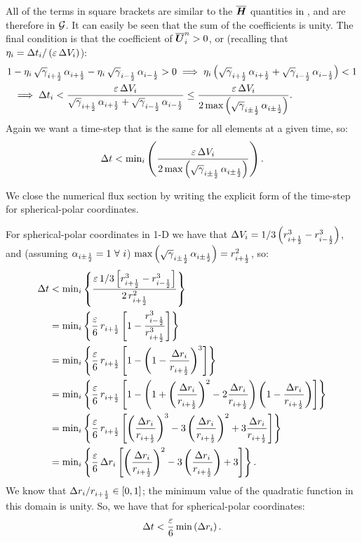 \documentclass[10pt,preprint]{aastex}
\begin{document}
All of the terms in square brackets are similar to the $\overline{\boldsymbol{H}}$ quantities in \citet{Qin2016}, and are therefore in $\mathcal{G}$. It can easily be seen that the sum of the coefficients is unity. The final condition is that the coefficient of $\overline{\boldsymbol{U}}^{n}_{i}>0$, or (recalling that $\eta_{i}=\Delta t_{i}/\left(\varepsilon\,\Delta V_{i}\right)$):
\begin{align}
    1&-\eta_{i}\,\sqrt{\gamma}_{i+\frac{1}{2}}\,\alpha_{i+\frac{1}{2}}-\eta_{i}\,\sqrt{\gamma}_{i-\frac{1}{2}}\,\alpha_{i-\frac{1}{2}}>0\implies\eta_{i}\left(\sqrt{\gamma}_{i+\frac{1}{2}}\,\alpha_{i+\frac{1}{2}}+\sqrt{\gamma}_{i-\frac{1}{2}}\,\alpha_{i-\frac{1}{2}}\right)<1\\
    &\implies\Delta t_{i}<\frac{\varepsilon\,\Delta V_{i}}{\sqrt{\gamma}_{i+\frac{1}{2}}\,\alpha_{i+\frac{1}{2}}+\sqrt{\gamma}_{i-\frac{1}{2}}\,\alpha_{i-\frac{1}{2}}}\leq\frac{\varepsilon\,\Delta V_{i}}{2\,\text{max}\left(\sqrt{\gamma}_{i\pm\frac{1}{2}}\,\alpha_{i\pm\frac{1}{2}}\right)}.
\end{align}
Again we want a time-step that is the same for all elements at a given time, so:
\begin{equation}
    \Delta t<\text{min}_{i}\left(\frac{\varepsilon\,\Delta V_{i}}{2\,\text{max}\left(\sqrt{\gamma}_{i\pm\frac{1}{2}}\,\alpha_{i\pm\frac{1}{2}}\right)}\right).
\end{equation}

We close the numerical flux section by writing the explicit form of the time-step for spherical-polar coordinates.

For spherical-polar coordinates in 1-D we have that $\Delta V_{i}=1/3\left(r_{i+\frac{1}{2}}^{3}-r_{i-\frac{1}{2}}^{3}\right)$, and (assuming $\alpha_{i\pm\frac{1}{2}}=1\ \forall\ i$) $\text{max}\left(\sqrt{\gamma}_{i\pm\frac{1}{2}}\,\alpha_{i\pm\frac{1}{2}}\right)=r_{i+\frac{1}{2}}^{2}$, so:
\begin{align}
    \Delta t&<\text{min}_{i}\left\{\frac{\varepsilon\,1/3\left[r_{i+\frac{1}{2}}^{3}-r_{i-\frac{1}{2}}^{3}\right]}{2\,r_{i+\frac{1}{2}}^{2}}\right\}\\
    &=\text{min}_{i}\left\{\frac{\varepsilon}{6}\,r_{i+\frac{1}{2}}\left[1-\frac{r_{i-\frac{1}{2}}^{3}}{r_{i+\frac{1}{2}}^{3}}\right]\right\}\\
    &=\text{min}_{i}\left\{\frac{\varepsilon}{6}\,r_{i+\frac{1}{2}}\left[1-\left(1-\frac{\Delta r_{i}}{r_{i+\frac{1}{2}}}\right)^{3}\right]\right\}\\
    &=\text{min}_{i}\left\{\frac{\varepsilon}{6}\,r_{i+\frac{1}{2}}\left[1-\left(1+\left(\frac{\Delta r_{i}}{r_{i+\frac{1}{2}}}\right)^{2}-2\frac{\Delta r_{i}}{r_{i+\frac{1}{2}}}\right)\left(1-\frac{\Delta r_{i}}{r_{i+\frac{1}{2}}}\right)\right]\right\}\\
    &=\text{min}_{i}\left\{\frac{\varepsilon}{6}\,r_{i+\frac{1}{2}}\left[\left(\frac{\Delta r_{i}}{r_{i+\frac{1}{2}}}\right)^{3}-3\left(\frac{\Delta r_{i}}{r_{i+\frac{1}{2}}}\right)^{2}+3\frac{\Delta r_{i}}{r_{i+\frac{1}{2}}}\right]\right\}\\
    &=\text{min}_{i}\left\{\frac{\varepsilon}{6}\,\Delta r_{i}\left[\left(\frac{\Delta r_{i}}{r_{i+\frac{1}{2}}}\right)^{2}-3\left(\frac{\Delta r_{i}}{r_{i+\frac{1}{2}}}\right)+3\right]\right\}.
\end{align}
We know that $\Delta r_{i}/r_{i+\frac{1}{2}}\in\left[0,1\right]$; the minimum value of the quadratic function in this domain is unity. So, we have that for spherical-polar coordinates:
\begin{equation}
    \Delta t<\frac{\varepsilon}{6}\,\text{min}\left(\Delta r_{i}\right).
\end{equation}
\end{document}
